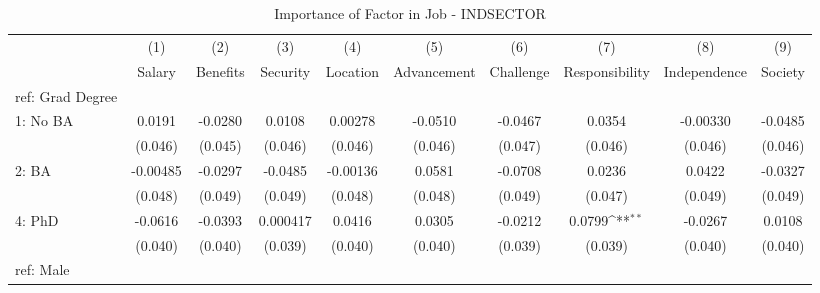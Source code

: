 \begin{table}[htbp]\centering
\def\sym#1{\ifmmode^{#1}\else\(^{#1}\)\fi}
\caption{Importance of Factor in Job - INDSECTOR \label{tab1}}
\begin{tabular}{l*{9}{c}}
\hline\hline
  &\multicolumn{1}{c}{(1)}&\multicolumn{1}{c}{(2)}&\multicolumn{1}{c}{(3)}&\multicolumn{1}{c}{(4)}&\multicolumn{1}{c}{(5)}&\multicolumn{1}{c}{(6)}&\multicolumn{1}{c}{(7)}&\multicolumn{1}{c}{(8)}&\multicolumn{1}{c}{(9)}\\
  &\multicolumn{1}{c}{Salary}&\multicolumn{1}{c}{Benefits}&\multicolumn{1}{c}{Security}&\multicolumn{1}{c}{Location}&\multicolumn{1}{c}{Advancement}&\multicolumn{1}{c}{Challenge}&\multicolumn{1}{c}{Responsibility}&\multicolumn{1}{c}{Independence}&\multicolumn{1}{c}{Society}\\
\hline
ref: Grad Degree&                     &                     &                     &                     &                     &                     &                     &                     &                     \\
[1em]
1: No BA&      0.0191         &     -0.0280         &      0.0108         &     0.00278         &     -0.0510         &     -0.0467         &      0.0354         &    -0.00330         &     -0.0485         \\
  &     (0.046)         &     (0.045)         &     (0.046)         &     (0.046)         &     (0.046)         &     (0.047)         &     (0.046)         &     (0.046)         &     (0.046)         \\
[1em]
2: BA&    -0.00485         &     -0.0297         &     -0.0485         &    -0.00136         &      0.0581         &     -0.0708         &      0.0236         &      0.0422         &     -0.0327         \\
  &     (0.048)         &     (0.049)         &     (0.049)         &     (0.048)         &     (0.048)         &     (0.049)         &     (0.047)         &     (0.049)         &     (0.049)         \\
[1em]
4: PhD&     -0.0616         &     -0.0393         &    0.000417         &      0.0416         &      0.0305         &     -0.0212         &      0.0799\sym{**} &     -0.0267         &      0.0108         \\
  &     (0.040)         &     (0.040)         &     (0.039)         &     (0.040)         &     (0.040)         &     (0.039)         &     (0.039)         &     (0.040)         &     (0.040)         \\
[1em]
ref: Male&                     &                     &                     &                     &                     &                     &                     &                     &                     \\

\end{tabular}
\end{table}
